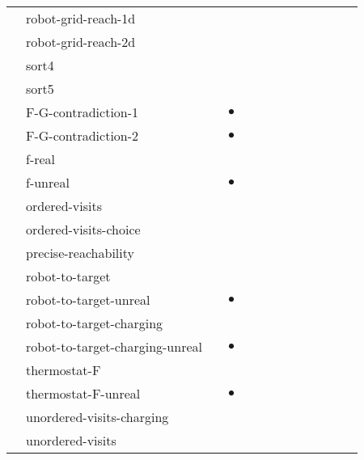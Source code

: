 \begin{tabular}{|c|lr|c||c|c|c||c|c|c|c||c|c|}
&  \textsf{robot-grid-reach-1d} & \cite{10.1145/3632899} &  &  &  &  &  &  &  &  &  &  \\
&  \textsf{robot-grid-reach-2d} & \cite{10.1145/3632899} &  &  &  &  &  &  &  &  &  &  \\
&  \textsf{sort4} & \cite{DBLP:conf/isola/MaderbacherWB24} &  &  &  &  &  &  &  &  &  &  \\
&  \textsf{sort5} & \cite{DBLP:conf/isola/MaderbacherWB24} &  &  &  &  &  &  &  &  &  &  \\
&  \textsf{F-G-contradiction-1} & \cite{DBLP:journals/pacmpl/HeimD25} & $\bullet$ &  &  &  &  &  &  &  &  &  \\
&  \textsf{F-G-contradiction-2} & \cite{DBLP:journals/pacmpl/HeimD25} & $\bullet$ &  &  &  &  &  &  &  &  &  \\
&  \textsf{f-real} & \cite{DBLP:journals/pacmpl/HeimD25} &  &  &  &  &  &  &  &  &  &  \\
&  \textsf{f-unreal} & \cite{DBLP:journals/pacmpl/HeimD25} & $\bullet$ &  &  &  &  &  &  &  &  &  \\
&  \textsf{ordered-visits} & \cite{DBLP:journals/pacmpl/HeimD25} &  &  &  &  &  &  &  &  &  &  \\
&  \textsf{ordered-visits-choice} & \cite{DBLP:journals/pacmpl/HeimD25} &  &  &  &  &  &  &  &  &  &  \\
&  \textsf{precise-reachability} & \cite{DBLP:journals/pacmpl/HeimD25} &  &  &  &  &  &  &  &  &  &  \\
&  \textsf{robot-to-target} & \cite{DBLP:journals/pacmpl/HeimD25} &  &  &  &  &  &  &  &  &  &  \\
&  \textsf{robot-to-target-unreal} & \cite{DBLP:journals/pacmpl/HeimD25} & $\bullet$ &  &  &  &  &  &  &  &  &  \\
&  \textsf{robot-to-target-charging} & \cite{DBLP:journals/pacmpl/HeimD25} &  &  &  &  &  &  &  &  &  &  \\
&  \textsf{robot-to-target-charging-unreal} & \cite{DBLP:journals/pacmpl/HeimD25} & $\bullet$ &  &  &  &  &  &  &  &  &  \\
&  \textsf{thermostat-F} & \cite{DBLP:journals/pacmpl/HeimD25} &  &  &  &  &  &  &  &  &  &  \\
&  \textsf{thermostat-F-unreal} & \cite{DBLP:journals/pacmpl/HeimD25} & $\bullet$ &  &  &  &  &  &  &  &  &  \\
&  \textsf{unordered-visits-charging} & \cite{DBLP:journals/pacmpl/HeimD25} &  &  &  &  &  &  &  &  &  &  \\
&  \textsf{unordered-visits} & \cite{DBLP:journals/pacmpl/HeimD25} &  &  &  &  &  &  &  &  &  &  \\

\end{tabular}
